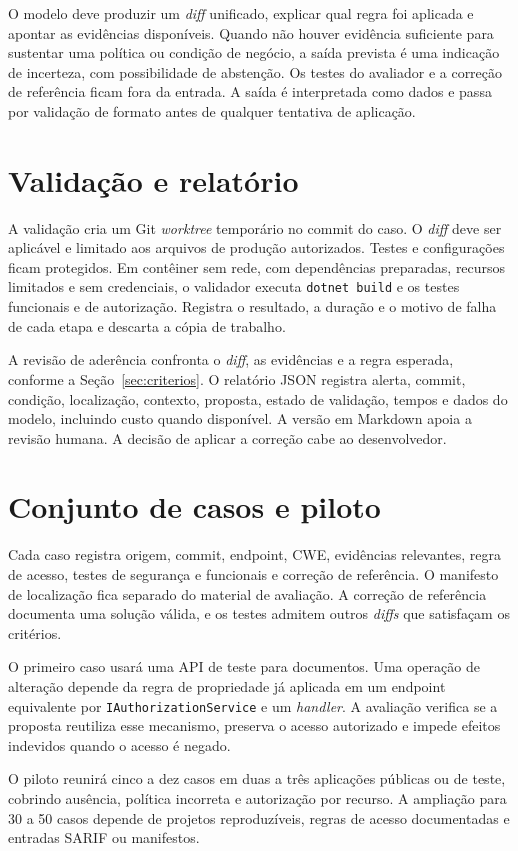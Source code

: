 O modelo deve produzir um \textit{diff} unificado, explicar qual regra foi aplicada e apontar as evidências disponíveis. Quando não houver evidência suficiente para sustentar uma política ou condição de negócio, a saída prevista é uma indicação de incerteza, com possibilidade de abstenção. Os testes do avaliador e a correção de referência ficam fora da entrada. A saída é interpretada como dados e passa por validação de formato antes de qualquer tentativa de aplicação.

\section{Validação e relatório}

A validação cria um Git \textit{worktree} temporário no commit do caso. O \textit{diff} deve ser aplicável e limitado aos arquivos de produção autorizados. Testes e configurações ficam protegidos. Em contêiner sem rede, com dependências preparadas, recursos limitados e sem credenciais, o validador executa \texttt{dotnet build} e os testes funcionais e de autorização. Registra o resultado, a duração e o motivo de falha de cada etapa e descarta a cópia de trabalho.

A revisão de aderência confronta o \textit{diff}, as evidências e a regra esperada, conforme a Seção~\ref{sec:criterios}. O relatório JSON registra alerta, commit, condição, localização, contexto, proposta, estado de validação, tempos e dados do modelo, incluindo custo quando disponível. A versão em Markdown apoia a revisão humana. A decisão de aplicar a correção cabe ao desenvolvedor.

\section{Conjunto de casos e piloto}

Cada caso registra origem, commit, endpoint, CWE, evidências relevantes, regra de acesso, testes de segurança e funcionais e correção de referência. O manifesto de localização fica separado do material de avaliação. A correção de referência documenta uma solução válida, e os testes admitem outros \textit{diffs} que satisfaçam os critérios.

O primeiro caso usará uma API de teste para documentos. Uma operação de alteração depende da regra de propriedade já aplicada em um endpoint equivalente por \texttt{IAuthorizationService} e um \textit{handler}. A avaliação verifica se a proposta reutiliza esse mecanismo, preserva o acesso autorizado e impede efeitos indevidos quando o acesso é negado.

O piloto reunirá cinco a dez casos em duas a três aplicações públicas ou de teste, cobrindo ausência, política incorreta e autorização por recurso. A ampliação para 30 a 50 casos depende de projetos reproduzíveis, regras de acesso documentadas e entradas SARIF ou manifestos.
